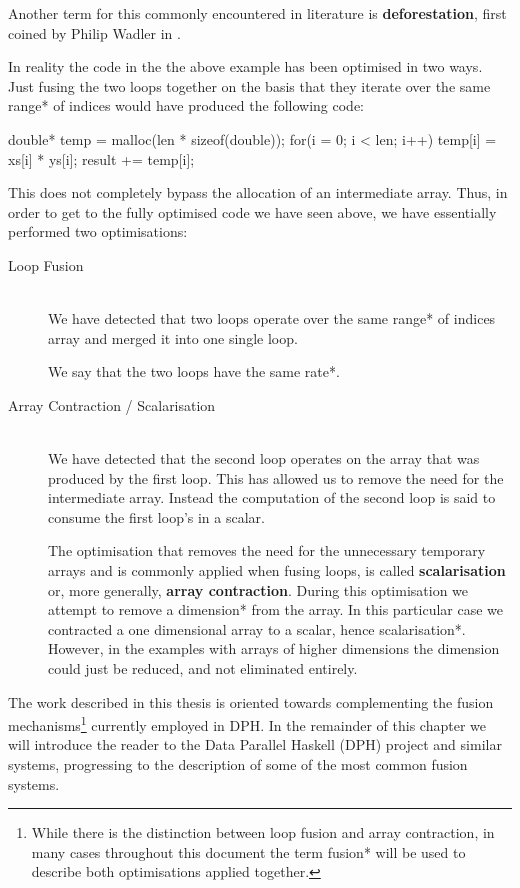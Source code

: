 \documentclass[preamble.tex]{subfiles}
\begin{document}
Another term for this commonly encountered in literature is \textbf{deforestation}, first coined by Philip Wadler in \cite{Wad90}.

In reality the \C code in the the above example has been optimised in two ways. Just fusing the two loops together on the basis that they iterate over the same \*range* of indices would have produced the following code:


\begin{ccode}
double* temp = malloc(len * sizeof(double));
for(i = 0; i < len; i++) {
	temp[i] = xs[i] * ys[i];
	result += temp[i];
}
\end{ccode}


This does not completely bypass the allocation of an intermediate array\iintermediate{}. Thus, in order to get to the fully optimised code we have seen above, we have essentially performed two optimisations:

\begin{description}

\item[Loop Fusion] \hfill \\

We have detected that two loops operate over the same \*range* of indices array and merged it into one single loop.

\begin{bluebox}
We say that the two loops have the same \*rate*.
\end{bluebox}

\item[Array Contraction / Scalarisation] \hfill \\

We have detected that the second loop operates on the array that was produced by the first loop. This has allowed us to remove the need for the intermediate array. Instead the computation of the second loop is said to consume the first loop's in a scalar.




The optimisation that removes the need for the unnecessary temporary arrays and is commonly applied when fusing loops, is called \textbf{scalarisation} or, more generally, \textbf{array contraction}. During this optimisation we attempt to remove a \*dimension* from the array. In this particular case we contracted a one dimensional array to a scalar, hence \*scalarisation*. However, in the examples with arrays of higher dimensions the dimension could just be reduced, and not eliminated entirely.
\end{description}
The work described in this thesis is oriented towards complementing the fusion mechanisms\footnote{While there is the distinction between loop fusion and array contraction, in many cases throughout this document the term \*fusion* will be used to describe both optimisations applied together.} currently employed in DPH. In the remainder of this chapter we will introduce the reader to the Data Parallel Haskell (DPH) project and similar systems, progressing to the description of some of the most common fusion systems.
\end{document}
